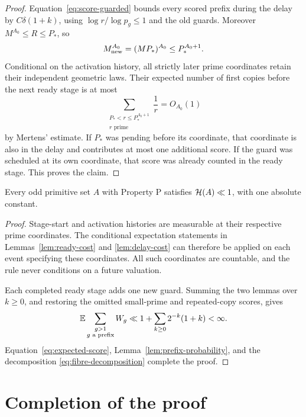 \begin{proof}
Equation~\eqref{eq:score-guarded} bounds every scored
prefix during the delay by \(C\delta(1+k)\), using
\(\log r/\log p_g\le1\) and the old guards.
Moreover \(M^{A_0}\le R\le P_*\), so
\[
 M_{\rm new}^{A_0}
       =(MP_*)^{A_0}\le P_*^{A_0+1}.
\]
Conditional on the activation history, all strictly
later prime coordinates retain their independent
geometric laws. Their expected number of first copies
before the next ready stage is at most
\[
 \sum_{\substack{P_*<r\le P_*^{A_0+1}\\r\text{ prime}}}\frac1r
       =O_{A_0}(1)
\]
by Mertens' estimate. If \(P_*\) was pending before its
coordinate, that coordinate is also in the delay and
contributes at most one additional score. If the guard
was scheduled at its own coordinate, that score was
already counted in the ready stage.
This proves the claim.
\end{proof}

\begin{proposition}\label{prop:odd-primitive}
Every odd primitive set \(A\) with Property P satisfies
\(\mathcal H(A)\ll1\), with one absolute constant.
\end{proposition}

\begin{proof}
Stage-start and activation histories are measurable at
their respective prime coordinates. The conditional
expectation statements in Lemmas~\ref{lem:ready-cost}
and \ref{lem:delay-cost} can therefore be applied on
each event specifying these coordinates. All such
coordinates are countable, and the rule never conditions
on a future valuation.

Each completed ready stage adds one new guard. Summing
the two lemmas over \(k\ge0\), and restoring the omitted
small-prime and repeated-copy scores, gives
\[
 \mathbb E\sum_{\substack{g>1\\g\text{ a prefix}}}W_g
 \ll1+\sum_{k\ge0}2^{-k}(1+k)<\infty.
\]
Equation~\eqref{eq:expected-score}, Lemma~\ref{lem:prefix-probability},
and the decomposition \eqref{eq:fibre-decomposition}
complete the proof.
\end{proof}

\section{Completion of the proof}\label{sec:completion}


